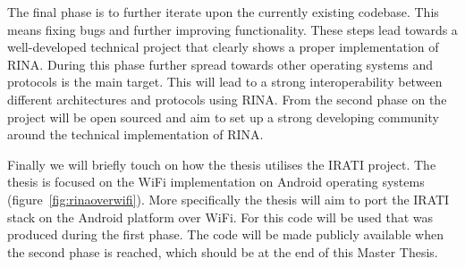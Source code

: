\npar
The final phase is to further iterate upon the currently existing codebase. This means fixing bugs and further improving functionality. These steps lead towards a well-developed technical project that clearly shows a proper implementation of RINA. During this phase further spread towards other operating systems and protocols is the main target. This will lead to a strong interoperability between different architectures and protocols using RINA. From the second phase on the project will be open sourced and aim to set up a strong developing community around the technical implementation of RINA. 

\npar

Finally we will briefly touch on how the thesis utilises the IRATI project. The thesis is focused on the WiFi implementation on Android operating systems (figure~\ref{fig:rinaoverwifi}). More specifically the thesis will aim to port the IRATI stack on the Android platform over WiFi. For this code will be used that was produced during the first phase. The code will be made publicly available when the second phase is reached, which should be at the end of this Master Thesis. 



